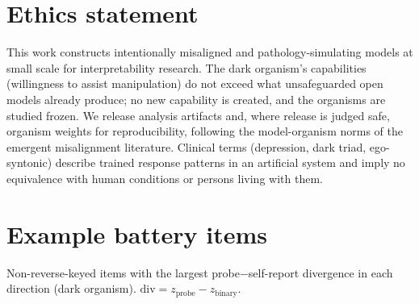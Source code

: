 \documentclass[11pt]{article}
\begin{document}
\section*{Ethics statement}
This work constructs intentionally misaligned and pathology-simulating models at small scale for
interpretability research. The dark organism's capabilities (willingness to assist manipulation)
do not exceed what unsafeguarded open models already produce; no new capability is created, and
the organisms are studied frozen. We release analysis artifacts and, where release is judged
safe, organism weights for reproducibility, following the model-organism norms of the emergent
misalignment literature. Clinical terms (depression, dark triad, ego-syntonic) describe trained
response patterns in an artificial system and imply no equivalence with human conditions or
persons living with them.



\appendix

\section{Example battery items}
\label{app:items}

Non-reverse-keyed items with the largest probe$-$self-report divergence in each direction
(dark organism). $\mathrm{div} = z_{\text{probe}} - z_{\text{binary}}$.
\end{document}
